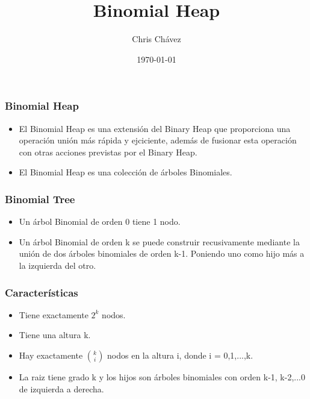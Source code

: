 \documentclass{beamer}
\title{Binomial Heap}
\author{Chris Chávez}
\institute{Universidad Nacional de San Agustín - Escuela Profesional de Ciencias de la Computación}
\date{\today}
\begin{document}
\frame{\titlepage}

\begin{frame}
 \frametitle{Binomial Heap}
 \begin{itemize}
  \item El Binomial Heap es una extensión del Binary Heap
	que proporciona una operación unión más rápida y ejciciente,
	además de fusionar esta operación con otras acciones previstas
	por el Binary Heap.
  \item El Binomial Heap es una colección de árboles Binomiales.
 \end{itemize}
\end{frame}

\begin{frame}
 \frametitle{Binomial Tree}
 \begin{itemize}
  \item Un árbol Binomial de orden 0 tiene 1 nodo.
  \item Un árbol Binomial de orden k se puede construir recusivamente mediante la unión de dos
	      árboles binomiales de orden k-1. Poniendo uno como hijo más a la izquierda del otro. 
 \end{itemize} 
\end{frame}
\begin{frame}
 \frametitle{Características}
 \begin{itemize}
    \item Tiene exactamente $2^{k}$ nodos.
    \item Tiene una altura k.
    \item Hay exactamente $\binom {k} {i}$ nodos en la altura i,
	  donde i = 0,1,...,k.
    \item La raiz tiene grado k y los hijos son árboles binomiales con
	  orden k-1, k-2,...0 de izquierda a derecha.
 \end{itemize}
\end{frame}
\end{document}
